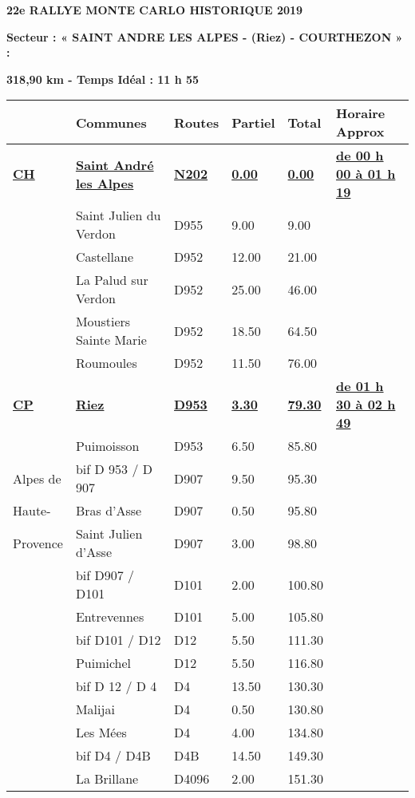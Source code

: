 \documentclass{article}%
\begin{document}
%
\normalsize%
\begin{center} \textbf{\LARGE{22e RALLYE MONTE CARLO HISTORIQUE 2019}} \end{center}%
\begin{flushleft} \textbf{Secteur : « SAINT ANDRE LES ALPES - (Riez) -  COURTHEZON » :
} \end{flushleft}%
\begin{flushright} \textbf{318,90 km - Temps Idéal : 11 h 55
} \end{flushright}%
\begin{longtable}{p{2.25cm}|p{6.7cm}|p{2.0cm}|p{1.5cm}|p{1.5cm}|p{3.5cm}}%
\hline%
&Communes&Routes&Partiel&Total&Horaire Approx\\%
\hline%
\endhead%
\endfoot%
\endlastfoot%
\textbf{\underline{﻿CH}}&\textbf{\underline{Saint André les Alpes}}&\textbf{\underline{N202}}&\textbf{\underline{0.00}}&\textbf{\underline{0.00}}&\textbf{\underline{de 00 h 00 à 01 h 19}}\\%
 &Saint Julien du Verdon&D955&9.00&9.00& \\%
 &Castellane&D952&12.00&21.00& \\%
 &La Palud sur Verdon&D952&25.00&46.00& \\%
 &Moustiers Sainte Marie&D952&18.50&64.50& \\%
 &Roumoules&D952&11.50&76.00& \\%
\textbf{\underline{CP}}&\textbf{\underline{Riez}}&\textbf{\underline{D953}}&\textbf{\underline{3.30}}&\textbf{\underline{79.30}}&\textbf{\underline{de 01 h 30 à 02 h 49}}\\%
 &Puimoisson&D953&6.50&85.80& \\%
Alpes de&bif D 953 / D 907&D907&9.50&95.30& \\%
Haute-&Bras d'Asse&D907&0.50&95.80& \\%
Provence&Saint Julien d'Asse&D907&3.00&98.80& \\%
 &bif D907 / D101&D101&2.00&100.80& \\%
 &Entrevennes&D101&5.00&105.80& \\%
 &bif D101 / D12&D12&5.50&111.30& \\%
 &Puimichel&D12&5.50&116.80& \\%
 &bif D 12 / D 4&D4&13.50&130.30& \\%
 &Malijai&D4&0.50&130.80& \\%
 &Les Mées&D4&4.00&134.80& \\%
 &bif D4 / D4B&D4B&14.50&149.30& \\%
 &La Brillane&D4096&2.00&151.30& \\%

\end{longtable}
\end{document}
